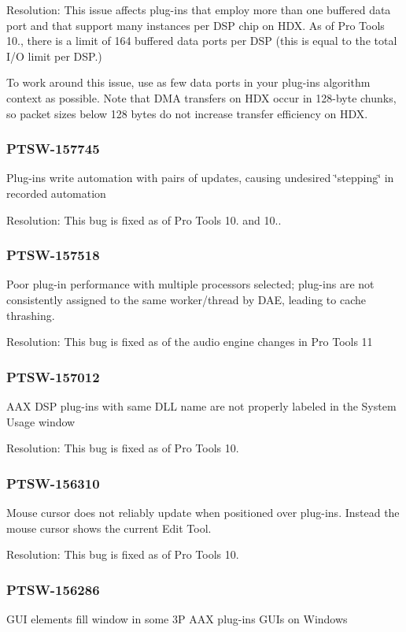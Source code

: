 Resolution\+: This issue affects plug-\/ins that employ more than one buffered data port and that support many instances per D\+SP chip on H\+DX. As of Pro Tools 10., there is a limit of 164 buffered data ports per D\+SP (this is equal to the total I/O limit per D\+SP.)

To work around this issue, use as few data ports in your plug-\/in\textquotesingle{}s algorithm context as possible. Note that D\+MA transfers on H\+DX occur in 128-\/byte chunks, so packet sizes below 128 bytes do not increase transfer efficiency on H\+DX.\hypertarget{a00846_PTSW-157745}{}\subsubsection{P\+T\+S\+W-\/157745}\label{a00846_PTSW-157745}
Plug-\/ins write automation with pairs of updates, causing undesired \char`\"{}stepping\char`\"{} in recorded automation

Resolution\+: This bug is fixed as of Pro Tools 10. and 10..\hypertarget{a00846_PTSW-157518}{}\subsubsection{P\+T\+S\+W-\/157518}\label{a00846_PTSW-157518}
Poor plug-\/in performance with multiple processors selected; plug-\/ins are not consistently assigned to the same worker/thread by D\+AE, leading to cache thrashing.

Resolution\+: This bug is fixed as of the audio engine changes in Pro Tools 11\hypertarget{a00846_PTSW-157012}{}\subsubsection{P\+T\+S\+W-\/157012}\label{a00846_PTSW-157012}
A\+AX D\+SP plug-\/ins with same D\+LL name are not properly labeled in the System Usage window

Resolution\+: This bug is fixed as of Pro Tools 10.\hypertarget{a00846_PTSW-156310}{}\subsubsection{P\+T\+S\+W-\/156310}\label{a00846_PTSW-156310}
Mouse cursor does not reliably update when positioned over plug-\/ins. Instead the mouse cursor shows the current Edit Tool.

Resolution\+: This bug is fixed as of Pro Tools 10.\hypertarget{a00846_PTSW-156286}{}\subsubsection{P\+T\+S\+W-\/156286}\label{a00846_PTSW-156286}
G\+UI elements fill window in some 3P A\+AX plug-\/ins G\+U\+Is on Windows

